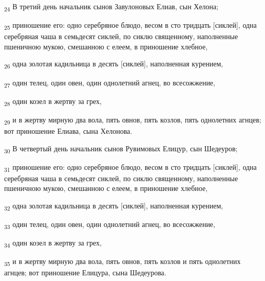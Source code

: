 \begin{tcolorbox}
\textsubscript{24} В третий день начальник сынов Завулоновых Елиав, сын Хелона;
\end{tcolorbox}
\begin{tcolorbox}
\textsubscript{25} приношение его: одно серебряное блюдо, весом в сто тридцать [сиклей], одна серебряная чаша в семьдесят сиклей, по сиклю священному, наполненные пшеничною мукою, смешанною с елеем, в приношение хлебное,
\end{tcolorbox}
\begin{tcolorbox}
\textsubscript{26} одна золотая кадильница в десять [сиклей], наполненная курением,
\end{tcolorbox}
\begin{tcolorbox}
\textsubscript{27} один телец, один овен, один однолетний агнец, во всесожжение,
\end{tcolorbox}
\begin{tcolorbox}
\textsubscript{28} один козел в жертву за грех,
\end{tcolorbox}
\begin{tcolorbox}
\textsubscript{29} и в жертву мирную два вола, пять овнов, пять козлов, пять однолетних агнцев; вот приношение Елиава, сына Хелонова.
\end{tcolorbox}
\begin{tcolorbox}
\textsubscript{30} В четвертый день начальник сынов Рувимовых Елицур, сын Шедеуров;
\end{tcolorbox}
\begin{tcolorbox}
\textsubscript{31} приношение его: одно серебряное блюдо, весом в сто тридцать [сиклей], одна серебряная чаша в семьдесят сиклей, по сиклю священному, наполненные пшеничною мукою, смешанною с елеем, в приношение хлебное,
\end{tcolorbox}
\begin{tcolorbox}
\textsubscript{32} одна золотая кадильница в десять [сиклей], наполненная курением,
\end{tcolorbox}
\begin{tcolorbox}
\textsubscript{33} один телец, один овен, один однолетний агнец, во всесожжение,
\end{tcolorbox}
\begin{tcolorbox}
\textsubscript{34} один козел в жертву за грех,
\end{tcolorbox}
\begin{tcolorbox}
\textsubscript{35} и в жертву мирную два вола, пять овнов, пять козлов и пять однолетних агнцев; вот приношение Елицура, сына Шедеурова.
\end{tcolorbox}
